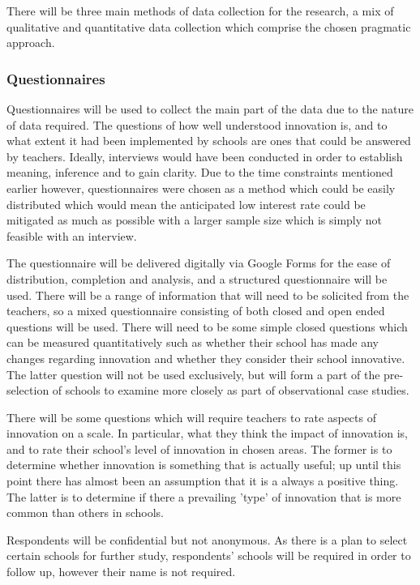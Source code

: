 \documentclass[11pt]{article}
\begin{document}
There will be three main methods of data collection for the research, a mix of qualitative and quantitative data collection which comprise the chosen pragmatic approach.

\subsubsection{Questionnaires}
Questionnaires will be used to collect the main part of the data due to the nature of data required. The questions of how well understood innovation is, and to what extent it had been implemented by schools are ones that could be answered by teachers. Ideally, interviews would have been conducted in order to establish meaning, inference and to gain clarity. Due to the time constraints mentioned earlier however, questionnaires were chosen as a method which could be easily distributed which would mean the anticipated low interest rate could be mitigated as much as possible with a larger sample size which is simply not feasible with an interview.

The questionnaire will be delivered digitally via Google Forms for the ease of distribution, completion and analysis, and a structured questionnaire will be used. There will be a range of information that will need to be solicited from the teachers, so a mixed questionnaire consisting of both closed and open ended questions will be used. There will need to be some simple closed questions which can be measured quantitatively such as whether their school has made any changes regarding innovation and whether they consider their school innovative. The latter question will not be used exclusively, but will form a part of the pre-selection of schools to examine more closely as part of observational case studies.

There will be some questions which will require teachers to rate aspects of innovation on a scale. In particular, what they think the impact of innovation is, and to rate their school's level of innovation in chosen areas. The former is to determine whether innovation is something that is actually useful; up until this point there has almost been an assumption that it is a always a positive thing. The latter is to determine if there a prevailing 'type' of innovation that is more common than others in schools.

Respondents will be confidential but not anonymous. As there is a plan to select certain schools for further study, respondents' schools will be required in order to follow up, however their name is not required. 
\end{document}
